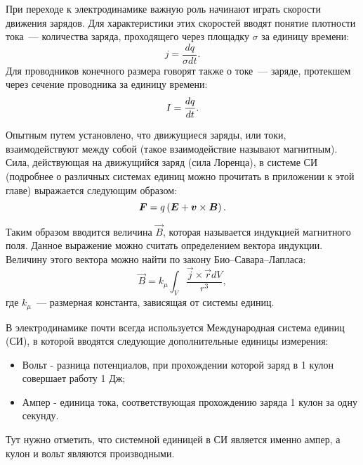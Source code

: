При переходе к электродинамике важную роль начинают играть скорости движения
зарядов. Для характеристики этих скоростей вводят понятие плотности тока~---
количества заряда, проходящего через площадку $\sigma$ за единицу времени:
\begin{equation}
	j = \frac{dq}{\sigma dt}.
\end{equation}
Для проводников конечного размера говорят также о токе~--- заряде, протекшем
через сечение проводника за единицу времени:
\begin{equation}
	\eqmark{current}
	I = \frac{dq}{dt}.
\end{equation}

Опытным путем установлено, что движущиеся заряды, или токи, взаимодействуют
между собой (такое взаимодействие называют магнитным). Сила, действующая на
движущийся заряд (сила Лоренца), в системе СИ (подробнее о различных системах единиц можно прочитать в приложении к этой главе) выражается следующим образом:
\begin{equation}
	\eqmark{lorentz}
	\vec{F} = q \left( \vec{E} + \vec{v} \times \vec{B} \right).
\end{equation}


Таким образом вводится величина $\vec{B}$, которая называется индукцией
магнитного поля. Данное выражение можно считать определением вектора индукции.
Величину этого вектора можно найти по закону Био--Савара--Лапласа:
\begin{equation}
	\vec{B} = k_{\mu}\int_{V}{\frac{\vec{j} \times \vec{r} dV}{r^3}},
\end{equation}
где $k_{\mu}$~--- размерная константа, зависящая от системы единиц.


В электродинамике почти всегда используется Международная система единиц (СИ), в которой вводятся следующие дополнительные единицы измерения:
\begin{itemize}
	\item Вольт - разница потенциалов, при прохождении которой заряд в 1 кулон совершает работу 1 Дж;
	\item Ампер - единица тока, соответствующая прохождению заряда 1 кулон за одну секунду. 
\end{itemize}
Тут нужно отметить, что системной единицей в СИ является именно ампер, а кулон и вольт являются производными.

